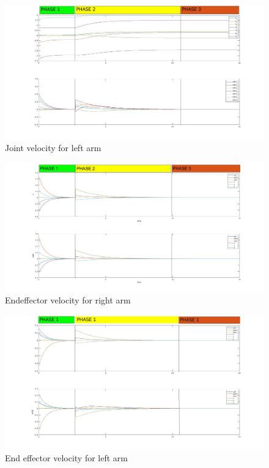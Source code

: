 \documentclass{article}
\begin{document}
\begin{figure}[h]
	\centering
	\includegraphics[width=1\textwidth]{imgs/ex3/joint velocity left.jpg}
	\caption{\label{fig:1} Joint velocity for left arm}
\end{figure}

\begin{figure}[h]
	\centering
	\includegraphics[width=1\textwidth]{imgs/ex3/non coop velocity right.jpg}
	\caption{\label{fig:1} Endeffector velocity for right arm}
\end{figure}
\begin{figure}[h]
	\centering
	\includegraphics[width=1\textwidth]{imgs/ex3/non coop velocity left.jpg}
	\caption{\label{fig:1} End effector velocity for left arm}
\end{figure}
\end{document}
